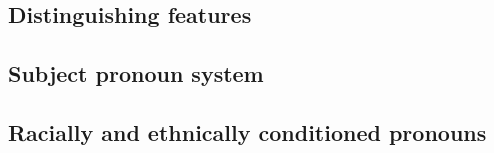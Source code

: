     \subsection{Distinguishing features}
    \subsection{Subject pronoun system}
    \subsection{Racially and ethnically conditioned pronouns} %




      





